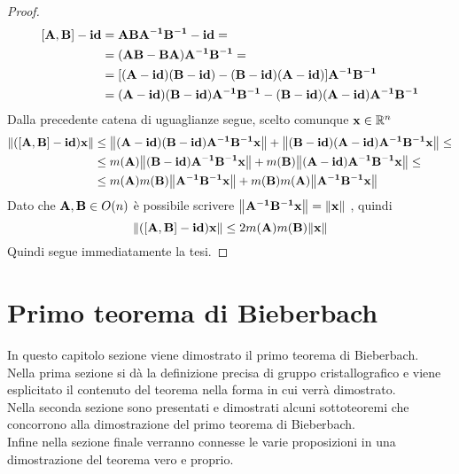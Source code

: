 \documentclass[12pt,a4paper]{book}
\begin{document}
\begin{proof}
\begin{equation*}
\begin{split}
[\vb{A,B}] - \vb{id} & = \vb{ABA^{-1}B^{-1} - id } = \\
& = \vb{(AB -BA)A^{-1}B^{-1} } = \\
& = [ \vb{ (A-id)(B-id) - (B-id)(A-id)}] \vb{A^{-1}B^{-1}} \\
& = \vb{( A-id)(B-id) A^{-1}B^{-1} -  (B-id)(A-id) A^{-1}B^{-1}}
\end{split}
\end{equation*}  
Dalla precedente catena di uguaglianze segue, scelto comunque $\vb{x} \in \mathbb{R}^n $
 \begin{equation*} 
\begin{split}
\norm{\vb{([A,B] - id )x}} & \leq \norm{\vb{ ( A-id)(B-id) A^{-1}B^{-1}x}} +  \norm{\vb{(B-id)(A-id) A^{-1}B^{-1}x}} \leq \\
& \leq m(\vb{A}) \norm{\vb{(B-id) A^{-1}B^{-1}x}} + m(\vb{B}) \norm{\vb{(A-id) A^{-1}B^{-1}x}} \leq \\ 
& \leq m(\vb{A})m(\vb{B})\norm{\vb{A^{-1}B^{-1}x}} + m(\vb{B})m(\vb{A}) \norm{\vb{A^{-1}B^{-1}x}}
\end{split}
\end{equation*}
Dato che $ \vb{A,B} \in O(n)$ è possibile scrivere $\norm{\vb{A^{-1}B^{-1}x}} = \norm{\vb{x}} $ , quindi 
\begin{equation*}
  \norm{\vb{([A,B] - id )x}}  \leq 2m(\vb{A})m(\vb{B})\norm{\vb{x}}
\end{equation*} 
Quindi segue immediatamente la tesi. 
\end{proof}

\chapter{Primo teorema di Bieberbach}
In questo capitolo sezione viene dimostrato il primo teorema di Bieberbach. \\
Nella prima sezione si dà la definizione precisa di gruppo cristallografico e viene esplicitato il contenuto del teorema nella forma in cui verrà dimostrato. \\
Nella seconda sezione sono presentati e dimostrati alcuni sottoteoremi che concorrono alla dimostrazione del primo teorema di Bieberbach. \\ 
Infine nella sezione finale verranno connesse le varie proposizioni in una dimostrazione del teorema vero e proprio.  \\
\end{document}
